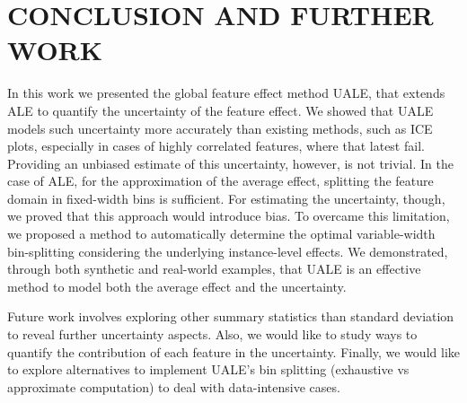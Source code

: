 \documentclass[twoside]{article}
\begin{document}
\section{CONCLUSION AND FURTHER WORK}

In this work we presented the global feature effect method UALE, that
extends ALE to quantify the uncertainty of the feature effect. We
showed that UALE models such uncertainty more accurately than existing
methods, such as ICE plots, especially in cases of highly correlated
features, where that latest fail. Providing an unbiased estimate of
this uncertainty, however, is not trivial. In the case of ALE, for the
approximation of the average effect, splitting the feature domain in
fixed-width bins is sufficient. For estimating the uncertainty,
though, we proved that this approach would introduce bias. To overcame
this limitation, we proposed a method to automatically determine the
optimal variable-width bin-splitting considering the underlying
instance-level effects. We demonstrated, through both synthetic and
real-world examples, that UALE is an effective method to model both
the average effect and the uncertainty.

Future work involves exploring other summary statistics than standard
deviation to reveal further uncertainty aspects. Also, we would like
to study ways to quantify the contribution of each feature in the
uncertainty. Finally, we would like to explore alternatives to
implement UALE's bin splitting (exhaustive vs approximate computation)
to deal with data-intensive cases.



\clearpage


\end{document}
